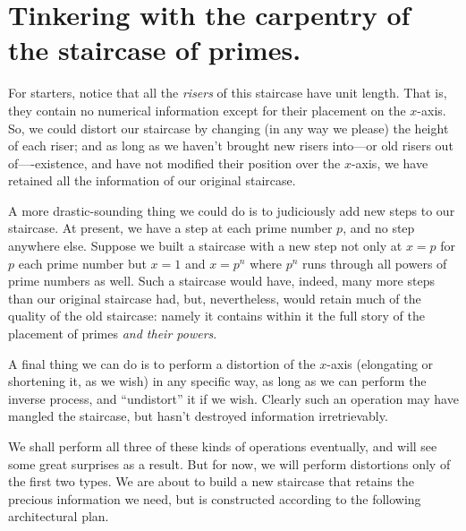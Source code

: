 \documentclass[11pt]{article}
\theoremstyle{plain}
\theoremstyle{definition}
\numberwithin{equation}{section}
\numberwithin{figure}{section}
\numberwithin{table}{section}
\begin{document}
\section{Tinkering with the carpentry of the staircase of primes.}

 
For starters, notice that all the {\em risers} of this staircase have
unit length. That is, they contain no numerical information except for
their placement on the $x$-axis. So, we could distort our staircase by
changing (in any way we please) the height of each riser; and as long
as we haven't brought new risers into---or old risers out
of----existence, and have not modified their position over the
$x$-axis, we have retained all the information of our original
staircase.
   
   
A more drastic-sounding thing we could do is to judiciously add new
steps to our staircase. At present, we have a step at each prime
number $p$, and no step anywhere else. Suppose we built a staircase
with a new step not only at $x=p$ for $p$ each prime number but $x =1$
and $x=p^n$ where $p^n$ runs through all powers of prime numbers as
well. Such a staircase would have, indeed, many more steps than our
original staircase had, but, nevertheless, would retain much of the
quality of the old staircase: namely it contains within it the full
story of the placement of primes {\em and their powers}.
     
A final thing we can do is to perform a distortion of the $x$-axis
(elongating or shortening it, as we wish) in any specific way, as long
as we can perform the inverse process, and ``undistort'' it if we wish.
Clearly such an operation may have mangled the staircase, but hasn't destroyed
information irretrievably.
     
We shall perform all three of these kinds of operations eventually,
and will see some great surprises as a result.  But for now, we will
perform distortions only of the first two types.  We are about to
build a new staircase that retains the precious information we need,
but is constructed according to the following architectural plan.
 
\end{document}
